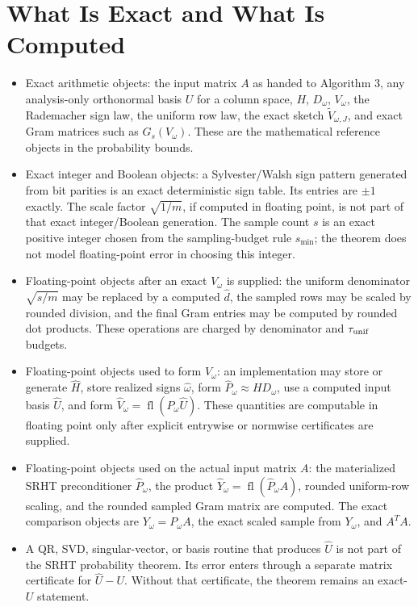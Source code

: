 \documentclass[11pt]{article}
\newcommand{\fl}{\operatorname{fl}}
\theoremstyle{remark}
\begin{document}
\section*{What Is Exact and What Is Computed}

\begin{itemize}
  \item Exact arithmetic objects: the input matrix \(A\) as handed to
  Algorithm 3, any analysis-only orthonormal basis \(U\) for a column space,
  \(H\), \(D_\omega\), \(V_\omega\), the Rademacher sign law, the uniform row
  law, the exact sketch \(\widetilde V_{\omega,J}\), and exact Gram matrices
  such as \(G_s(V_\omega)\).  These are the mathematical reference objects in
  the probability bounds.
  \item Exact integer and Boolean objects: a Sylvester/Walsh sign pattern
  generated from bit parities is an exact deterministic sign table.  Its
  entries are \(\pm1\) exactly.  The scale factor \(\sqrt{1/m}\), if computed
  in floating point, is not part of that exact integer/Boolean generation.
  The sample count \(s\) is an exact positive integer chosen from the
  sampling-budget rule \(s_{\min}\); the theorem does not model floating-point
  error in choosing this integer.
  \item Floating-point objects after an exact \(V_\omega\) is supplied:
  the uniform denominator \(\sqrt{s/m}\) may be replaced by a computed
  \(\widehat d\), the sampled rows may be scaled by rounded division, and the
  final Gram entries may be computed by rounded dot products.  These operations
  are charged by denominator and \(\tau_{\rm unif}\) budgets.
  \item Floating-point objects used to form \(V_\omega\): an implementation may
  store or generate \(\widehat H\), store realized signs
  \(\widehat\omega\), form \(\widehat P_\omega\approx HD_\omega\), use a
  computed input basis \(\widehat U\), and form
  \(\widehat V_\omega=\fl(\widehat P_\omega\widehat U)\).  These quantities
  are computable in floating point only after explicit entrywise or normwise
  certificates are supplied.
  \item Floating-point objects used on the actual input matrix \(A\): the
  materialized SRHT preconditioner \(\widehat P_\omega\), the product
  \(\widehat Y_\omega=\fl(\widehat P_\omega A)\), rounded uniform-row scaling,
  and the rounded sampled Gram matrix are computed.  The exact comparison
  objects are \(Y_\omega=P_\omega A\), the exact scaled sample from
  \(Y_\omega\), and \(A^TA\).
  \item A QR, SVD, singular-vector, or basis routine that produces
  \(\widehat U\) is not part of the SRHT probability theorem.  Its error enters
  through a separate matrix certificate for \(\widehat U-U\).  Without that
  certificate, the theorem remains an exact-\(U\) statement.
\end{itemize}
\end{document}
